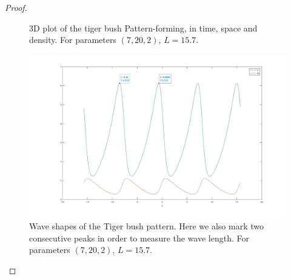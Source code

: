 \documentclass[11pt]{article}
\theoremstyle{quest}
\begin{document}
\begin{proof}
\begin{figure}[h!]
        \caption{3D plot of the tiger bush Pattern-forming, in time, space and density.
        For parameters $(7,20,2)$, $L=15.7$.}
        \label{fig:q6fig1}
    \end{figure}
    \begin{figure}[h!]
        \includegraphics[width=\linewidth]{figures/Q6_fig2.jpg}
        \caption{Wave shapes of the Tiger bush pattern. Here we also mark two consecutive peaks
        in order to measure the wave length. For parameters $(7,20,2)$, $L=15.7$.}
        \label{fig:q6fig2}
    \end{figure}
    \clearpage
     
\end{proof}
\end{document}
